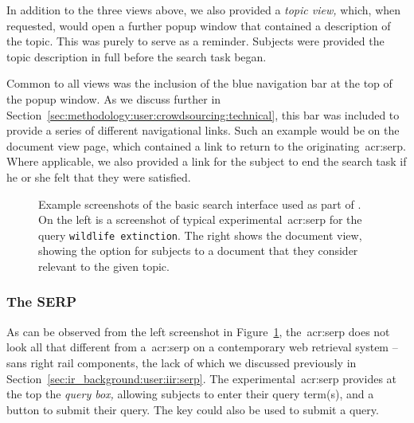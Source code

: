 In addition to the three views above, we also provided a \emph{topic view,} which, when requested, would open a further popup window that contained a description of the topic. This was purely to serve as a reminder. Subjects were provided the topic description in full before the search task began.

Common to all views was the inclusion of the blue navigation bar at the top of the popup window. As we discuss further in Section~\ref{sec:methodology:user:crowdsourcing:technical}, this bar was included to provide a series of different navigational links. Such an example would be on the document view page, which contained a link to return to the originating~\gls{acr:serp}. Where applicable, we also provided a link for the subject to end the search task if he or she felt that they were satisfied.

\begin{figure}[t!]
    \centering
    \caption[Example screenshots of the \treconomics~interface]{Example screenshots of the basic search interface used as part of \treconomics. On the left is a screenshot of typical experimental~\gls{acr:serp} for the query \texttt{wildlife extinction}. The right shows the document view, showing the option for subjects to  a document that they consider relevant to the given topic.}
    \label{fig:interfaces}
\end{figure}

\subsubsection{The SERP}\label{sec:methodology:user:interface:serp}
As can be observed from the left screenshot in Figure~\ref{fig:interfaces}, the~\gls{acr:serp} does not look all that different from a~\gls{acr:serp} on a contemporary web retrieval system -- sans right rail components, the lack of which we discussed previously in Section~\ref{sec:ir_background:user:iir:serp}. The experimental~\gls{acr:serp} provides at the top the \emph{query box,} allowing subjects to enter their query term(s), and a button to submit their query. The \Return key could also be used to submit a query.


